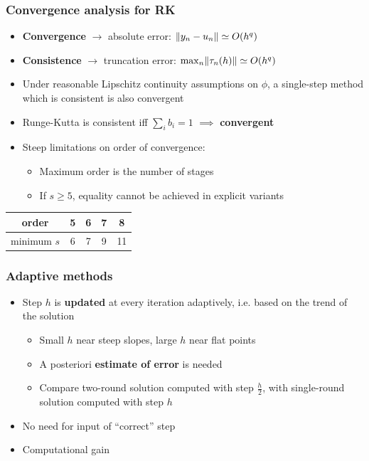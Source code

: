 \documentclass{beamer}
\begin{document}
\begin{frame} %
\frametitle{Convergence analysis for RK}
	\begin{itemize}
		\item \textbf{Convergence} $\to$ absolute error: $\lVert y_n - u_n\rVert \simeq O(h^q)$
		\item \textbf{Consistence} $\to$ truncation error: $\max_n \lVert\tau_n(h)\rVert \simeq O(h^q)$
		\item Under reasonable Lipschitz continuity assumptions on $\phi$, a single-step method which is consistent is also convergent
		\pause
		\item Runge-Kutta is consistent iff $\sum_i b_i = 1$ $\implies$ \textbf{convergent}
		\item Steep limitations on order of convergence:
		\begin{itemize}
			\item Maximum order is the number of stages
			\item If $s \ge 5$, equality cannot be achieved in explicit variants \\[15pt]
		\end{itemize}
	\end{itemize}
	\begin{center}
		\begin{tabular}{c|cccc}
			order & 5 & 6 & 7 & 8\\
			\hline
			minimum $s$ & 6 & 7 & 9 & 11 
		\end{tabular}
	\end{center}
\end{frame}


\begin{frame} %
	\frametitle{Adaptive methods}
	\begin{itemize}
		\item Step $h$ is \textbf{updated} at every iteration adaptively, i.e. based on the trend of the solution
		\begin{itemize}
			\item Small $h$ near steep slopes, large $h$ near flat points
			\item A posteriori \textbf{estimate of error} is needed
			\item Compare two-round solution computed with step $\frac{h}{2}$, with single-round solution computed with step $h$
		\end{itemize}
		\item No need for input of ``correct'' step
		\item Computational gain %
	\end{itemize}
\end{frame}
\end{document}
